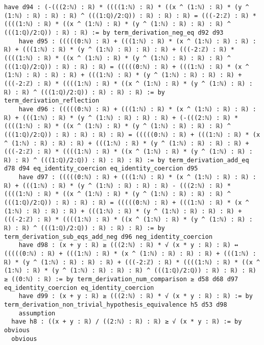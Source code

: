 \documentclass{article}
\begin{document}
\begin{tcolorbox}[colback=white!10, width=\linewidth]
\begin{lstlisting}[language=Lean4]
    have d94 : (-(((2:ℕ) : ℝ) * ((((1:ℕ) : ℝ) * ((x ^ (1:ℕ) : ℝ) * (y ^ (1:ℕ) : ℝ) : ℝ) : ℝ) ^ (((1:ℚ)/2:ℚ)) : ℝ) : ℝ) : ℝ) = (((-2:ℤ) : ℝ) * ((((1:ℕ) : ℝ) * ((x ^ (1:ℕ) : ℝ) * (y ^ (1:ℕ) : ℝ) : ℝ) : ℝ) ^ (((1:ℚ)/2:ℚ)) : ℝ) : ℝ) := by term_derivation_neg_eq d92 d93
    have d95 : (((((0:ℕ) : ℝ) + (((1:ℕ) : ℝ) * (x ^ (1:ℕ) : ℝ) : ℝ) : ℝ) + (((1:ℕ) : ℝ) * (y ^ (1:ℕ) : ℝ) : ℝ) : ℝ) + (((-2:ℤ) : ℝ) * ((((1:ℕ) : ℝ) * ((x ^ (1:ℕ) : ℝ) * (y ^ (1:ℕ) : ℝ) : ℝ) : ℝ) ^ (((1:ℚ)/2:ℚ)) : ℝ) : ℝ) : ℝ) = (((((0:ℕ) : ℝ) + (((1:ℕ) : ℝ) * (x ^ (1:ℕ) : ℝ) : ℝ) : ℝ) + (((1:ℕ) : ℝ) * (y ^ (1:ℕ) : ℝ) : ℝ) : ℝ) + (((-2:ℤ) : ℝ) * ((((1:ℕ) : ℝ) * ((x ^ (1:ℕ) : ℝ) * (y ^ (1:ℕ) : ℝ) : ℝ) : ℝ) ^ (((1:ℚ)/2:ℚ)) : ℝ) : ℝ) : ℝ) := by term_derivation_reflection
    have d96 : (((((0:ℕ) : ℝ) + (((1:ℕ) : ℝ) * (x ^ (1:ℕ) : ℝ) : ℝ) : ℝ) + (((1:ℕ) : ℝ) * (y ^ (1:ℕ) : ℝ) : ℝ) : ℝ) + (-(((2:ℕ) : ℝ) * ((((1:ℕ) : ℝ) * ((x ^ (1:ℕ) : ℝ) * (y ^ (1:ℕ) : ℝ) : ℝ) : ℝ) ^ (((1:ℚ)/2:ℚ)) : ℝ) : ℝ) : ℝ) : ℝ) = (((((0:ℕ) : ℝ) + (((1:ℕ) : ℝ) * (x ^ (1:ℕ) : ℝ) : ℝ) : ℝ) + (((1:ℕ) : ℝ) * (y ^ (1:ℕ) : ℝ) : ℝ) : ℝ) + (((-2:ℤ) : ℝ) * ((((1:ℕ) : ℝ) * ((x ^ (1:ℕ) : ℝ) * (y ^ (1:ℕ) : ℝ) : ℝ) : ℝ) ^ (((1:ℚ)/2:ℚ)) : ℝ) : ℝ) : ℝ) := by term_derivation_add_eq d78 d94 eq_identity_coercion eq_identity_coercion d95
    have d97 : (((((0:ℕ) : ℝ) + (((1:ℕ) : ℝ) * (x ^ (1:ℕ) : ℝ) : ℝ) : ℝ) + (((1:ℕ) : ℝ) * (y ^ (1:ℕ) : ℝ) : ℝ) : ℝ) - (((2:ℕ) : ℝ) * ((((1:ℕ) : ℝ) * ((x ^ (1:ℕ) : ℝ) * (y ^ (1:ℕ) : ℝ) : ℝ) : ℝ) ^ (((1:ℚ)/2:ℚ)) : ℝ) : ℝ) : ℝ) = (((((0:ℕ) : ℝ) + (((1:ℕ) : ℝ) * (x ^ (1:ℕ) : ℝ) : ℝ) : ℝ) + (((1:ℕ) : ℝ) * (y ^ (1:ℕ) : ℝ) : ℝ) : ℝ) + (((-2:ℤ) : ℝ) * ((((1:ℕ) : ℝ) * ((x ^ (1:ℕ) : ℝ) * (y ^ (1:ℕ) : ℝ) : ℝ) : ℝ) ^ (((1:ℚ)/2:ℚ)) : ℝ) : ℝ) : ℝ) := by term_derivation_sub_eqs_add_neg d96 neg_identity_coercion
    have d98 : (x + y : ℝ) ≥ (((2:ℕ) : ℝ) * √ (x * y : ℝ) : ℝ) ↔ (((((0:ℕ) : ℝ) + (((1:ℕ) : ℝ) * (x ^ (1:ℕ) : ℝ) : ℝ) : ℝ) + (((1:ℕ) : ℝ) * (y ^ (1:ℕ) : ℝ) : ℝ) : ℝ) + (((-2:ℤ) : ℝ) * ((((1:ℕ) : ℝ) * ((x ^ (1:ℕ) : ℝ) * (y ^ (1:ℕ) : ℝ) : ℝ) : ℝ) ^ (((1:ℚ)/2:ℚ)) : ℝ) : ℝ) : ℝ) ≥ ((0:ℕ) : ℝ) := by term_derivation_num_comparison ≥ d58 d68 d97 eq_identity_coercion eq_identity_coercion
    have d99 : (x + y : ℝ) ≥ (((2:ℕ) : ℝ) * √ (x * y : ℝ) : ℝ) := by term_derivation_non_trivial_hypothesis_equivalence h5 d53 d98
    assumption
  have h8 : ((x + y : ℝ) / ((2:ℕ) : ℝ) : ℝ) ≥ √ (x * y : ℝ) := by obvious
  obvious

\end{lstlisting}
\end{tcolorbox}
\end{document}
